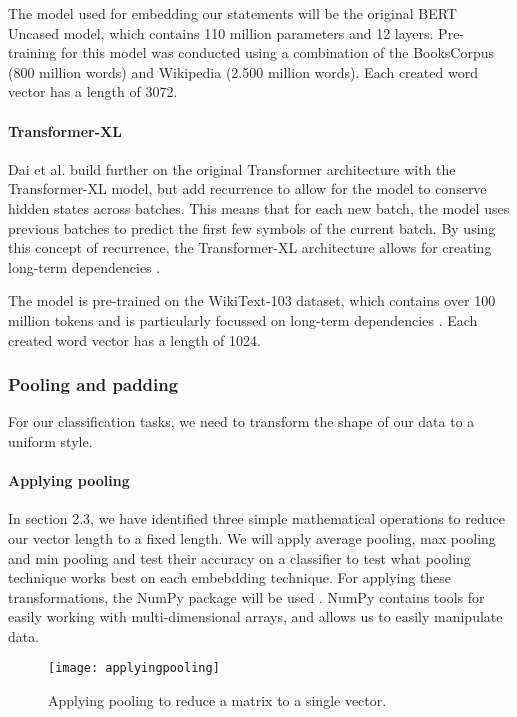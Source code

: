 The model used for embedding our statements will be the original BERT Uncased model, which contains 110 million parameters and 12 layers. 
Pre-training for this model was conducted using a combination of the BooksCorpus (800 million words) and Wikipedia (2.500 million words).
Each created word vector has a length of 3072. 

\paragraph{Transformer-XL}
Dai et al. build further on the original Transformer architecture with the Transformer-XL model, but add recurrence to allow for the model to conserve hidden states across batches.
This means that for each new batch, the model uses previous batches to predict the first few symbols of the current batch.
By using this concept of recurrence, the Transformer-XL architecture allows for creating long-term dependencies \cite{dai2019}. 

The model is pre-trained on the WikiText-103 dataset, which contains over 100 million tokens and is particularly focussed on long-term dependencies \cite{merity2017}. 
Each created word vector has a length of 1024. 

\subsubsection{Pooling and padding}
For our classification tasks, we need to transform the shape of our data to a uniform style.

\paragraph{Applying pooling}
In section 2.3, we have identified three simple mathematical operations to reduce our vector length to a fixed length.
We will apply average pooling, max pooling and min pooling and test their accuracy on a classifier to test what pooling technique works best on each embebdding technique.
For applying these transformations, the NumPy package will be used \cite{numpy}.
NumPy contains tools for easily working with multi-dimensional arrays, and allows us to easily manipulate data. 

\begin{figure}[h]
    \centering
    \texttt{[image: applyingpooling]}
    \caption{Applying pooling to reduce a matrix to a single vector.}
\end{figure}

